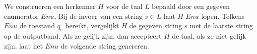 We construeren een herkenner $H$ voor de taal $L$ bepaald door een gegeven enumerator $Enu$. Bij de invoer van een string $s \in L$ laat $H$ $Enu$ lopen. Telkens $Enu$ de toestand $q_e$ bereikt, vergelijkt $H$ de gegeven string $s$ met de laatste string op de outputband. Als ze gelijk zijn, dan accepteert $H$ de taal, als ze niet gelijk zijn, laat het $Enu$ de volgende string genereren.